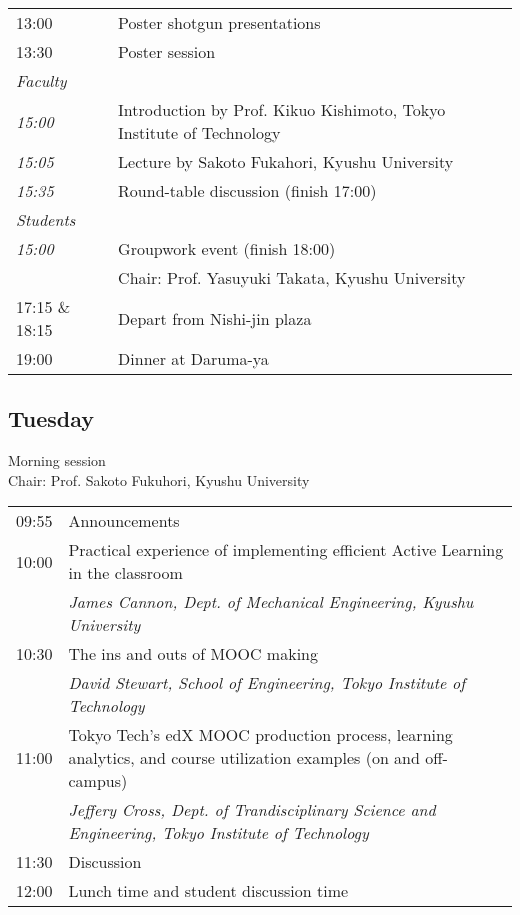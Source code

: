 \noindent\begin{tabular}{|l|l|}
    \hline
    13:00   & Poster shotgun presentations \\
    13:30   & Poster session \\
    \emph{Faculty} & \\
    \emph{15:00} & Introduction by Prof. Kikuo Kishimoto, Tokyo Institute of Technology \\
    \emph{15:05} & Lecture by Sakoto Fukahori, Kyushu University \\
    \emph{15:35} & Round-table discussion (finish 17:00) \\
    \emph{Students} & \\
    \emph{15:00} & Groupwork event (finish 18:00) \\
            & Chair: Prof. Yasuyuki Takata, Kyushu University \\
    17:15 \& 18:15   & Depart from Nishi-jin plaza \\
    19:00   & Dinner at Daruma-ya \\
    \hline
\end{tabular}

\subsection*{Tuesday}

\vspace{2em}
Morning session \\
Chair: Prof. Sakoto Fukuhori, Kyushu University

\noindent\begin{tabular}{|l|l|}
    \hline
    09:55   & Announcements \\
    10:00   & Practical experience of implementing efficient Active Learning in the classroom \\
            & \emph{James Cannon, Dept. of Mechanical Engineering, Kyushu University} \\
    10:30   & The ins and outs of MOOC making \\
            & \emph{David Stewart, School of Engineering, Tokyo Institute of Technology} \\
    11:00   & Tokyo Tech’s edX MOOC production process, learning analytics, and course utilization examples (on and off-campus) \\
            & \emph{Jeffery Cross, Dept. of Trandisciplinary Science and Engineering, Tokyo Institute of Technology} \\
    11:30   & Discussion \\
    12:00   & Lunch time and student discussion time \\

    \hline
\end{tabular}

